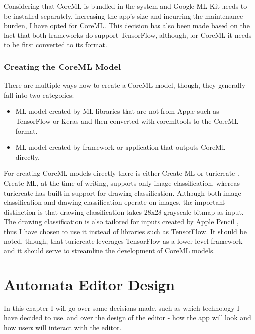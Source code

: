 Considering that CoreML is bundled in the system and Google ML Kit needs to be installed separately, increasing the app's size and incurring the maintenance burden, I have opted for CoreML. This decision has also been made based on the fact that both frameworks do support TensorFlow, although, for CoreML it needs to be first converted to its format.

\subsection{Creating the CoreML Model}

There are multiple ways how to create a CoreML model, though, they generally fall into two categories:
\begin{itemize}
    \item ML model created by ML libraries that are not from Apple such as TensorFlow or Keras \cite{keras} and then converted with coremltools \cite{coremltools} to the CoreML format.
    \item ML model created by framework or application that outputs CoreML directly.
\end{itemize}

For creating CoreML models directly there is either Create ML \cite{create-ml} or turicreate \cite{turicreate}. Create ML, at the time of writing, supports only image classification, whereas turicreate has built-in support for drawing classification. Although both image classification and drawing classification operate on images, the important distinction is that drawing classification takes 28x28 grayscale bitmap as input. The drawing classification is also tailored for inputs created by Apple Pencil \cite{drawing-classification}, thus I have chosen to use it instead of libraries such as TensorFlow. It should be noted, though, that turicreate leverages TensorFlow as a lower-level framework and it should serve to streamline the development of CoreML models.

\chapter{Automata Editor Design}
\label{chap:design}

In this chapter I will go over some decisions made, such as which technology I have decided to use, and over the design of the editor - how the app will look and how users will interact with the editor.

